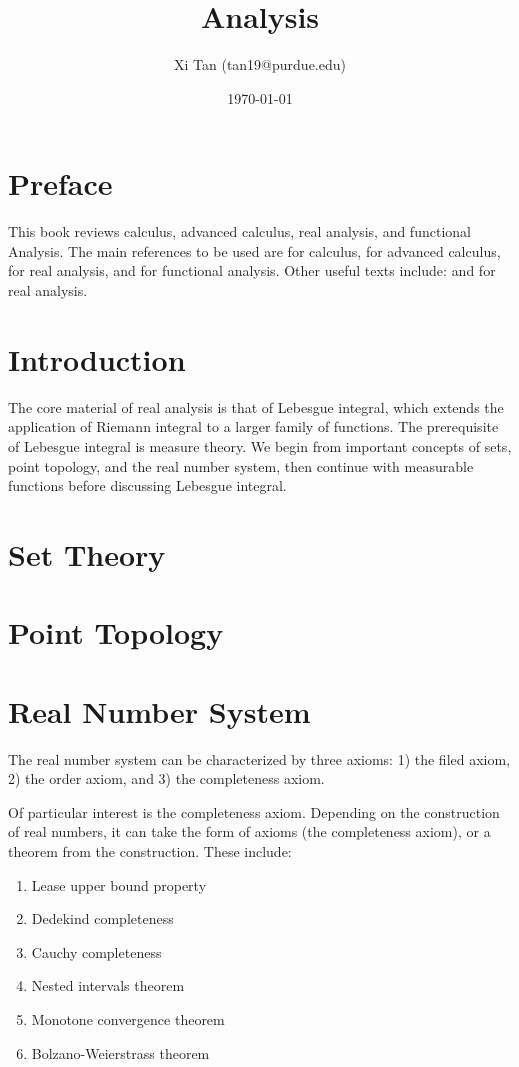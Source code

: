 \documentclass{article}
\title{Analysis}
\author{Xi Tan (tan19@purdue.edu)}
\date{\today}
\begin{document}
\maketitle

\tableofcontents
\newpage

\section*{Preface}
This book reviews calculus, advanced calculus, real analysis, and functional Analysis. The main references to be used are \cite{Stewart} for calculus, \cite{Rudin} for advanced calculus, \cite{Royden} for real analysis, and \cite{Kreyszig} for functional analysis. Other useful texts include: \cite{Folland} and \cite{Torchinsky} for real analysis.
\newpage

\section{Introduction}
The core material of real analysis is that of Lebesgue integral, which extends the application of Riemann integral to a larger family of functions. The prerequisite of Lebesgue integral is measure theory. We begin from important concepts of sets, point topology, and the real number system, then continue with measurable functions before discussing Lebesgue integral.

\section{Set Theory}


\section{Point Topology}
\section{Real Number System}
The real number system can be characterized by three axioms: 1) the filed axiom, 2) the order axiom, and 3) the completeness axiom.

Of particular interest is the completeness axiom. Depending on the construction of real numbers, it can take the form of axioms (the completeness axiom), or a theorem from the construction. These include:
\begin{enumerate}
	\item Lease upper bound property
	\item Dedekind completeness
	\item Cauchy completeness
	\item Nested intervals theorem
	\item Monotone convergence theorem
	\item Bolzano-Weierstrass theorem
\end{enumerate}
\end{document}
